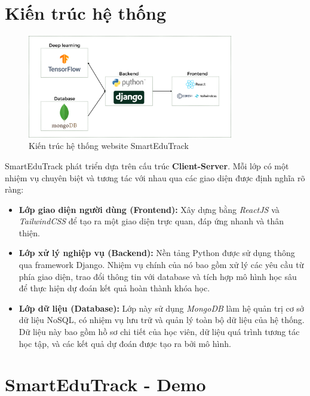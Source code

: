 \section{Kiến trúc hệ thống}
\begin{figure}[H]
    \centering
    \includegraphics[width = 0.8\textwidth]{imgs/website-system-architecture.png}
    \caption{Kiến trúc hệ thống website SmartEduTrack}
    \label{fig:website-system-architecture}
\end{figure}
SmartEduTrack phát triển dựa trên cấu trúc \textbf{Client-Server}. Mỗi lớp có một nhiệm vụ chuyên biệt và tương tác với nhau qua các giao diện được định nghĩa rõ ràng:

\begin{itemize}
    \item \textbf{Lớp giao diện người dùng (Frontend):} Xây dựng bằng \textit{ReactJS} và \textit{TailwindCSS} để tạo ra một giao diện trực quan, đáp ứng nhanh và thân thiện.
    
    \item \textbf{Lớp xử lý nghiệp vụ (Backend):} Nền tảng Python được sử dụng thông qua framework Django. Nhiệm vụ chính của nó bao gồm xử lý các yêu cầu từ phía giao diện, trao đổi thông tin với database và tích hợp mô hình học sâu để thực hiện dự đoán kết quả hoàn thành khóa học.
    
    \item \textbf{Lớp dữ liệu (Database):} Lớp này sử dụng \textit{MongoDB} làm hệ quản trị cơ sở dữ liệu NoSQL, có nhiệm vụ lưu trữ và quản lý toàn bộ dữ liệu của hệ thống. Dữ liệu này bao gồm hồ sơ chi tiết của học viên, dữ liệu quá trình tương tác học tập, và các kết quả dự đoán được tạo ra bởi mô hình.
\end{itemize}

\section{SmartEduTrack - Demo}
